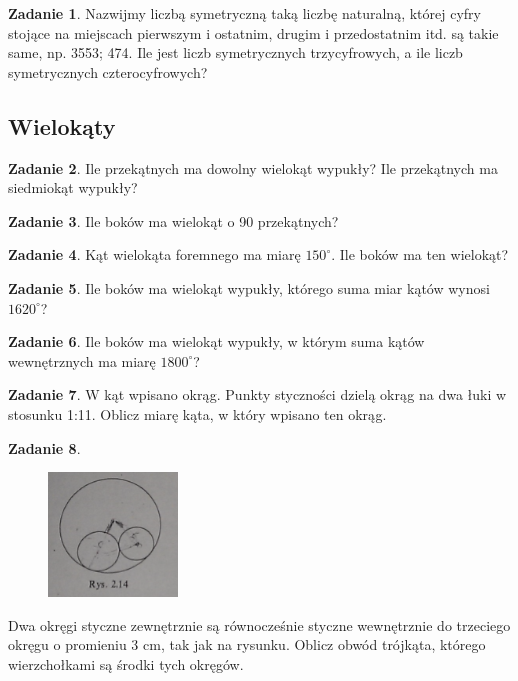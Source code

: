 \documentclass[11pt]{article}
\theoremstyle{definition}
\newtheorem{zad}{Zadanie}
\numberwithin{zad}{section}
\begin{document}
\begin{zad}
Nazwijmy liczbą symetryczną taką liczbę naturalną, której cyfry stojące na miejscach pierwszym i ostatnim, drugim i przedostatnim itd. są takie same, np. 3553; 474. Ile jest liczb symetrycznych trzycyfrowych, a ile liczb symetrycznych czterocyfrowych?
\end{zad}

\subsection{Wielokąty}

\begin{zad}
Ile przekątnych ma dowolny wielokąt wypukły? Ile przekątnych ma siedmiokąt wypukły?
\end{zad}

\begin{zad}
Ile boków ma wielokąt o 90 przekątnych?
\end{zad}

\begin{zad}
Kąt wielokąta foremnego ma miarę $150^\circ$. Ile boków ma ten wielokąt?
\end{zad}

\begin{zad}
Ile boków ma wielokąt wypukły, którego suma miar kątów wynosi $1620^\circ$?
\end{zad}

\begin{zad}
Ile boków ma wielokąt wypukły, w którym suma kątów wewnętrznych ma miarę $1800^\circ$?
\end{zad}

\begin{zad}
W kąt wpisano okrąg. Punkty styczności dzielą okrąg na dwa łuki w stosunku 1:11. Oblicz miarę kąta, w który wpisano ten okrąg.
\end{zad}

\begin{zad}

\begin{figure}[H]
\centering
\includegraphics[width=0.4\linewidth]{rys214.png}
\end{figure}

Dwa okręgi styczne zewnętrznie są równocześnie styczne wewnętrznie do trzeciego okręgu o promieniu 3 cm, tak jak na rysunku. Oblicz obwód trójkąta, którego wierzchołkami są środki tych okręgów.

\end{zad}
\end{document}
